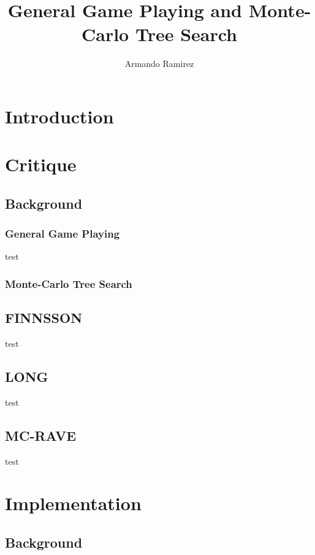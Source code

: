 \documentclass[letterpaper]{article}
\title{General Game Playing and Monte-Carlo Tree Search}
\author{Armando Ramirez}
\begin{document}
\maketitle

\section{Introduction}

\section{Critique}

\subsection{Background}

\subsubsection{General Game Playing}
test \cite{StanfordGGP}
\subsubsection{Monte-Carlo Tree Search}

\subsection{FINNSSON}

test \cite{finnsson2012generalized}

\subsection{LONG}

test \cite{long2010understanding}

\subsection{MC-RAVE}

test \cite{gelly2011monte}

\section{Implementation}

\subsection{Background}
\end{document}
